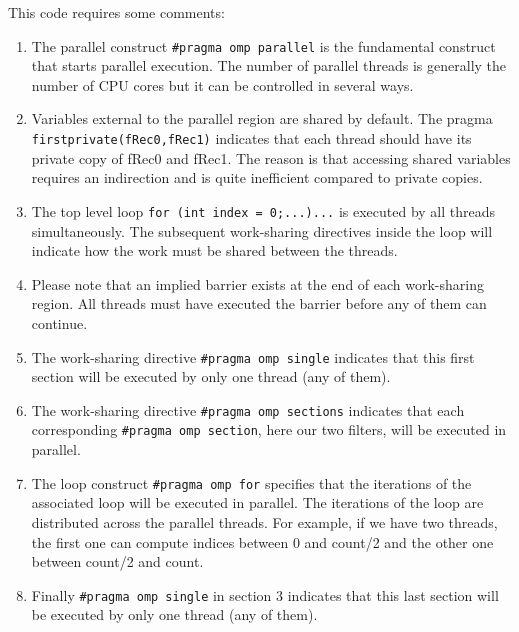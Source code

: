This code requires some comments:

\begin{enumerate}
\item The parallel construct \lstinline!#pragma omp parallel! is the fundamental construct that starts parallel execution. The number of parallel threads is generally the number of CPU cores but it can be controlled in several ways.

\item Variables external to the parallel region are shared by default. The pragma \lstinline!firstprivate(fRec0,fRec1)! indicates that each thread should have its private copy of fRec0 and fRec1. The reason is that accessing shared variables requires an indirection and is quite inefficient compared to private copies.

\item The top level loop \lstinline!for (int index = 0;...)...! is executed by all threads simultaneously. The subsequent work-sharing directives inside the loop will indicate how the work must be shared between the threads. 

\item Please note that an implied barrier exists at the end of each work-sharing region. All threads must have executed the barrier before any of them can continue.

\item The work-sharing directive \lstinline!#pragma omp single! indicates that this first section will be executed by only one thread (any of them).

\item The work-sharing directive \lstinline!#pragma omp sections! indicates that each corresponding \lstinline!#pragma omp section!, here our two filters, will be executed in parallel.

\item The loop construct \lstinline!#pragma omp for! specifies that the iterations of the associated loop will be executed in parallel. The iterations of the loop are distributed across the parallel threads. For example, if we have two threads, the first one can compute indices between 0 and count/2 and the other one between count/2 and count. 

\item Finally \lstinline!#pragma omp single!  in section 3 indicates that this last section will be executed by only one thread (any of them).

\end{enumerate}

